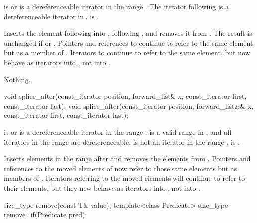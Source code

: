 \begin{itemdescr}
\pnum
\expects
{} is  or is a dereferenceable
iterator in the range .
The iterator following  is a dereferenceable iterator in .
 is .

\pnum
\effects
Inserts the element following  into , following
, and removes it from .
The result is unchanged if  or . Pointers
and references to  continue to refer to the same element but as a member of
. Iterators to  continue to refer to
the same element, but now behave as iterators into , not into .

\pnum
\throws
Nothing.

\pnum
\complexity
{}
\end{itemdescr}

%
\begin{itemdecl}
void splice_after(const_iterator position, forward_list& x,
                  const_iterator first, const_iterator last);
void splice_after(const_iterator position, forward_list&& x,
                  const_iterator first, const_iterator last);
\end{itemdecl}

\begin{itemdescr}
\pnum
\expects
{} is  or is a
dereferenceable iterator in the range .  is a
valid range in , and all iterators in the range  are
dereferenceable.  is not an iterator in the range .
 is .

\pnum
\effects
Inserts elements in the range  after  and
removes the elements from . Pointers and references to the moved elements of
 now refer to those same elements but as members of . Iterators
referring to the moved elements will continue to refer to their elements, but they now
behave as iterators into , not into .

\pnum
\complexity
{}
\end{itemdescr}

%
%
\begin{itemdecl}
size_type remove(const T& value);
template<class Predicate> size_type remove_if(Predicate pred);
\end{itemdecl}

